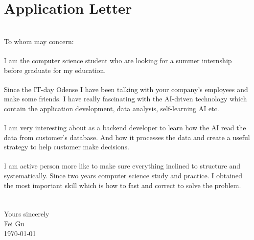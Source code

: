 \section{Application Letter}\label{sec:application-letter}
\newline
\\
To whom may concern:\\

\paragraph{}
I am the computer science student who are looking for a summer internship before graduate
for my education.\\

\paragraph{}
Since the IT-day Odense I have been talking with your company's employees and make some friends.
I have really fascinating with the AI-driven technology which contain the application development,
data analysis, self-learning AI etc.\\

\paragraph{}
I am very interesting about as a backend developer to learn how the AI read the data
from customer's database.
And how it processes the data and create a useful strategy to help customer make decisions.\\

\paragraph{}
I am active person more like to make sure everything inclined to structure and systematically.
Since two years computer science study and practice.
I obtained the most important skill which is how to fast and correct to solve the problem.

\paragraph{}
\noindent \\
Yours sincerely\\
Fei Gu\\
\today